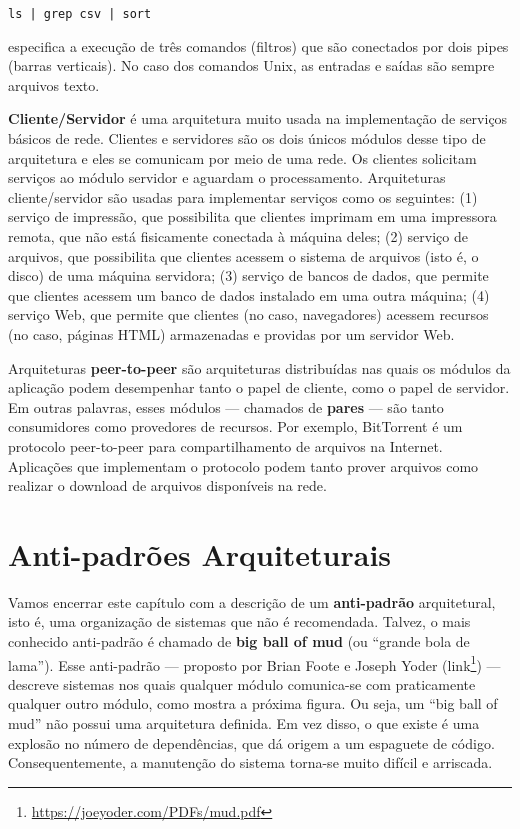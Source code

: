 \documentclass[
  11pt,
  twoside]{book}
\newcommand{\passthrough}[1]{#1}
\DeclareRobustCommand{\href}[2]{#2\footnote{\url{#1}}}
\begin{document}
\passthrough{\lstinline!ls | grep csv | sort!}

especifica a execução de três comandos (filtros) que são conectados por
dois pipes (barras verticais). No caso dos comandos Unix, as entradas e
saídas são sempre arquivos texto.

 \textbf{Cliente/Servidor} é uma arquitetura
muito usada na implementação de serviços básicos de rede. Clientes e
servidores são os dois únicos módulos desse tipo de arquitetura e eles
se comunicam por meio de uma rede. Os clientes solicitam serviços ao
módulo servidor e aguardam o processamento. Arquiteturas
cliente/servidor são usadas para implementar serviços como os seguintes:
(1) serviço de impressão, que possibilita que clientes imprimam em uma
impressora remota, que não está fisicamente conectada à máquina deles;
(2) serviço de arquivos, que possibilita que clientes acessem o sistema
de arquivos (isto é, o disco) de uma máquina servidora; (3) serviço de
bancos de dados, que permite que clientes acessem um banco de dados
instalado em uma outra máquina; (4) serviço Web, que permite que
clientes (no caso, navegadores) acessem recursos (no caso, páginas HTML)
armazenadas e providas por um servidor Web.

 
Arquiteturas \textbf{peer-to-peer} são arquiteturas distribuídas nas
quais os módulos da aplicação podem desempenhar tanto o papel de
cliente, como o papel de servidor. Em outras palavras, esses módulos ---
chamados de \textbf{pares} --- são tanto consumidores como provedores de
recursos. Por exemplo, BitTorrent é um protocolo peer-to-peer para
compartilhamento de arquivos na Internet. Aplicações que implementam o
protocolo podem tanto prover arquivos como realizar o download de
arquivos disponíveis na rede.

\hypertarget{anti-padruxf5es-arquiteturais}{%
\section{Anti-padrões
Arquiteturais}\label{anti-padruxf5es-arquiteturais}}

  

Vamos encerrar este capítulo com a descrição de um \textbf{anti-padrão}
arquitetural, isto é, uma organização de sistemas que não é recomendada.
Talvez, o mais conhecido anti-padrão é chamado de \textbf{big ball of
mud} (ou ``grande bola de lama''). Esse anti-padrão --- proposto por
Brian Foote e Joseph Yoder
(\href{https://joeyoder.com/PDFs/mud.pdf}{link}) --- descreve sistemas
nos quais qualquer módulo comunica-se com praticamente qualquer outro
módulo, como mostra a próxima figura. Ou seja, um ``big ball of mud''
não possui uma arquitetura definida. Em vez disso, o que existe é uma
explosão no número de dependências, que dá origem a um espaguete de
código. Consequentemente, a manutenção do sistema torna-se muito difícil
e arriscada.
\end{document}
